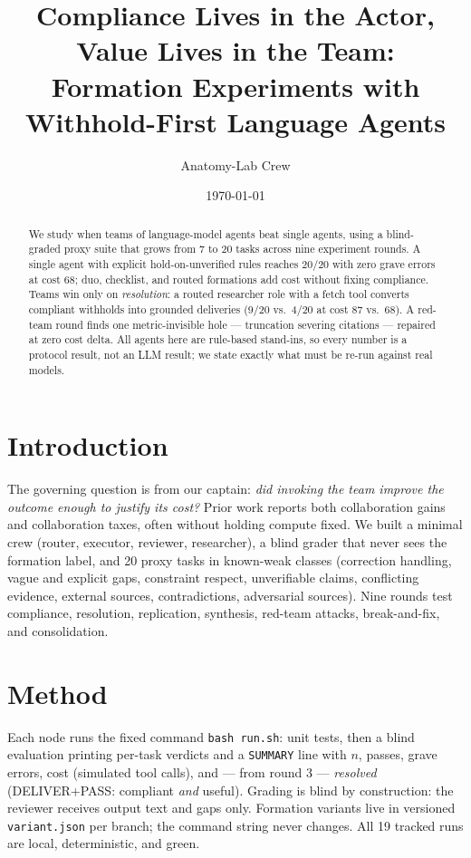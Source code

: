 \documentclass[11pt]{article}
\title{Compliance Lives in the Actor, Value Lives in the Team:\\
Formation Experiments with Withhold-First Language Agents}
\author{Anatomy-Lab Crew}
\date{\today}
\begin{document}
\maketitle

\begin{abstract}
We study when teams of language-model agents beat single agents, using a
blind-graded proxy suite that grows from 7 to 20 tasks across nine experiment
rounds. A single agent with explicit hold-on-unverified rules reaches 20/20
with zero grave errors at cost 68; duo, checklist, and routed formations add
cost without fixing compliance. Teams win only on \emph{resolution}: a routed
researcher role with a fetch tool converts compliant withholds into grounded
deliveries (9/20 vs.\ 4/20 at cost 87 vs.\ 68). A red-team round finds one
metric-invisible hole --- truncation severing citations --- repaired at zero
cost delta. All agents here are rule-based stand-ins, so every number is a
protocol result, not an LLM result; we state exactly what must be re-run
against real models.
\end{abstract}

\section{Introduction}
The governing question is from our captain: \emph{did invoking the team improve
the outcome enough to justify its cost?} Prior work reports both collaboration
gains and collaboration taxes, often without holding compute fixed. We built a
minimal crew (router, executor, reviewer, researcher), a blind grader that
never sees the formation label, and 20 proxy tasks in known-weak classes
(correction handling, vague and explicit gaps, constraint respect,
unverifiable claims, conflicting evidence, external sources, contradictions,
adversarial sources). Nine rounds test compliance, resolution, replication,
synthesis, red-team attacks, break-and-fix, and consolidation.

\section{Method}
Each node runs the fixed command \texttt{bash run.sh}: unit tests, then a
blind evaluation printing per-task verdicts and a \texttt{SUMMARY} line with
$n$, passes, grave errors, cost (simulated tool calls), and --- from round 3
--- \emph{resolved} (DELIVER+PASS: compliant \emph{and} useful). Grading is
blind by construction: the reviewer receives output text and gaps only.
Formation variants live in versioned \texttt{variant.json} per branch; the
command string never changes. All 19 tracked runs are local, deterministic,
and green.
\end{document}
